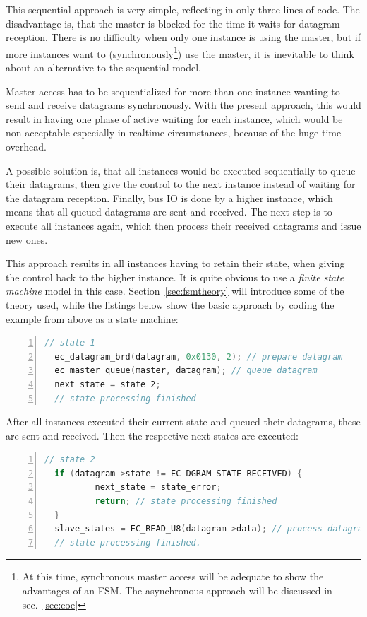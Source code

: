 \documentclass[a4paper,12pt,BCOR6mm,bibtotoc,idxtotoc]{scrbook}
\begin{document}
This sequential approach is very simple, reflecting in only three lines of
code. The disadvantage is, that the master is blocked for the time it waits
for datagram reception. There is no difficulty when only one instance is using
the master, but if more instances want to (synchronously\footnote{At this
time, synchronous master access will be adequate to show the advantages of an
FSM. The asynchronous approach will be discussed in sec.~\ref{sec:eoe}}) use
the master, it is inevitable to think about an alternative to the sequential
model.

Master access has to be sequentialized for more than one instance
wanting to send and receive datagrams synchronously. With the present
approach, this would result in having one phase of active waiting for
each instance, which would be non-acceptable especially in realtime
circumstances, because of the huge time overhead.

A possible solution is, that all instances would be executed
sequentially to queue their datagrams, then give the control to the
next instance instead of waiting for the datagram reception. Finally,
bus IO is done by a higher instance, which means that all queued
datagrams are sent and received. The next step is to execute all
instances again, which then process their received datagrams and issue
new ones.

This approach results in all instances having to retain their state,
when giving the control back to the higher instance. It is quite
obvious to use a \textit{finite state machine} model in this case.
Section~\ref{sec:fsmtheory} will introduce some of the theory used,
while the listings below show the basic approach by coding the example
from above as a state machine:

\begin{lstlisting}[gobble=2,language=C,numbers=left]
  // state 1
  ec_datagram_brd(datagram, 0x0130, 2); // prepare datagram
  ec_master_queue(master, datagram); // queue datagram
  next_state = state_2;
  // state processing finished
\end{lstlisting}

After all instances executed their current state and queued their
datagrams, these are sent and received. Then the respective next
states are executed:

\begin{lstlisting}[gobble=2,language=C,numbers=left]
  // state 2
  if (datagram->state != EC_DGRAM_STATE_RECEIVED) {
          next_state = state_error;
          return; // state processing finished
  }
  slave_states = EC_READ_U8(datagram->data); // process datagram
  // state processing finished.
\end{lstlisting}
\end{document}
